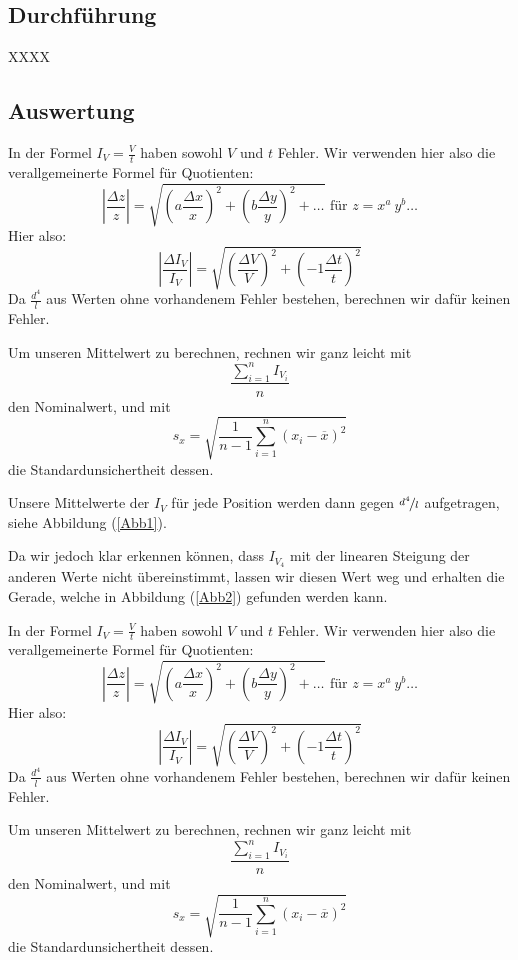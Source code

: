 \documentclass[11pt,a4paper]{article}
\begin{document}
\pagebreak

\subsection{Durchführung}

XXXX

\subsection{Auswertung}

In der Formel $I_V=\frac{V}{t}$ haben sowohl $V$ und $t$ Fehler. Wir verwenden hier also die verallgemeinerte Formel f\"ur Quotienten:
$$
\left\vert\frac{\Delta z}{z}\right\vert=\sqrt{\left(a\frac{\Delta x}{x}\right)^2+\left(b\frac{\Delta y}{y}\right)^2+\ldots}\textrm{ f\"ur }z=x^a\ y^b\ldots
$$
Hier also:
$$
\left\vert\frac{\Delta I_V}{I_V}\right\vert=\sqrt{\left(\frac{\Delta V}{V}\right)^2+\left(-1\frac{\Delta t}{t}\right)^2}
$$
Da $\frac{d^4}{l}$ aus Werten ohne vorhandenem Fehler bestehen, berechnen wir daf\"ur keinen Fehler.

Um unseren Mittelwert zu berechnen, rechnen wir ganz leicht mit 
$$
\frac{\sum_{i=1}^n I_{V_i}}{n}
$$
den Nominalwert, und mit
$$
s_x=\sqrt{\frac{1}{n-1}\sum_{i=1}^n(x_i-\overline{x})^2}
$$
die Standardunsichertheit dessen.

Unsere Mittelwerte der $I_V$ f\"ur jede Position werden dann gegen $\nicefrac{d^4}{l}$ aufgetragen, siehe Abbildung (\ref{Abb1}).

Da wir jedoch klar erkennen k\"onnen, dass $I_{V_4}$ mit der linearen Steigung der anderen Werte nicht \"ubereinstimmt, lassen wir diesen Wert weg und erhalten die Gerade, welche in Abbildung (\ref{Abb2}) gefunden werden kann.

In der Formel $I_V=\frac{V}{t}$ haben sowohl $V$ und $t$ Fehler. Wir verwenden hier also die verallgemeinerte Formel f\"ur Quotienten:
$$
\left\vert\frac{\Delta z}{z}\right\vert=\sqrt{\left(a\frac{\Delta x}{x}\right)^2+\left(b\frac{\Delta y}{y}\right)^2+\ldots}\textrm{ f\"ur }z=x^a\ y^b\ldots
$$
Hier also:
$$
\left\vert\frac{\Delta I_V}{I_V}\right\vert=\sqrt{\left(\frac{\Delta V}{V}\right)^2+\left(-1\frac{\Delta t}{t}\right)^2}
$$
Da $\frac{d^4}{l}$ aus Werten ohne vorhandenem Fehler bestehen, berechnen wir daf\"ur keinen Fehler.

Um unseren Mittelwert zu berechnen, rechnen wir ganz leicht mit 
$$
\frac{\sum_{i=1}^n I_{V_i}}{n}
$$
den Nominalwert, und mit
$$
s_x=\sqrt{\frac{1}{n-1}\sum_{i=1}^n(x_i-\overline{x})^2}
$$
die Standardunsichertheit dessen.
\end{document}
